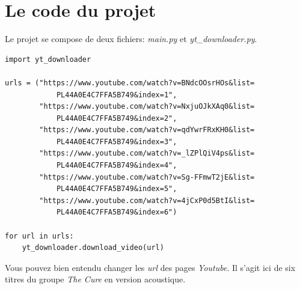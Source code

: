 \documentclass[a4paper,12pt]{book}
\begin{document}
\section{Le code du projet}
Le projet se compose de deux fichiers: \textit{main.py} et \textit{yt\_downloader.py}.

\begin{lstlisting}[caption=Le fichier \textit{main.py}]
import yt_downloader

urls = ("https://www.youtube.com/watch?v=BNdcOOsrHOs&list=
            PL44A0E4C7FFA5B749&index=1",
        "https://www.youtube.com/watch?v=NxjuOJkXAq0&list=
            PL44A0E4C7FFA5B749&index=2",
        "https://www.youtube.com/watch?v=qdYwrFRxKH0&list=
            PL44A0E4C7FFA5B749&index=3",
        "https://www.youtube.com/watch?v=_lZPlQiV4ps&list=
            PL44A0E4C7FFA5B749&index=4",
        "https://www.youtube.com/watch?v=Sg-FFmwT2jE&list=
            PL44A0E4C7FFA5B749&index=5",
        "https://www.youtube.com/watch?v=4jCxP0d5BtI&list=
            PL44A0E4C7FFA5B749&index=6")

for url in urls:
    yt_downloader.download_video(url)
\end{lstlisting}
\medskip

Vous pouvez bien entendu changer les \textit{url} des pages \textit{Youtube}. Il s'agit ici de six titres du groupe \textit{The Cure} en version acoustique.
\medskip
\end{document}
